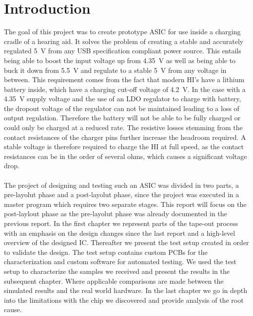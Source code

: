 \section{Introduction}
\label{chap:introduction}
The goal of this project was to create prototype \ac{ASIC} for use inside a charging cradle of a hearing aid. It solves the problem of creating a stable and accurately regulated \qty{5}{\volt} from any USB specification compliant power source. This entails being able to boost the input voltage up from \qty{4.35}{\volt} as well as being able to buck it down from \qty{5.5}{\volt} and regulate to a stable \qty{5}{\volt} from any voltage in between. This requirement comes from the fact that modern \ac{HI}'s have a lithium battery inside, which have a charging cut-off voltage of \qty{4.2}{\volt}. In the case with a \qty{4.35}{\volt} supply voltage and the use of an \ac{LDO} regulator to charge with battery, the dropout voltage of the regulator can not be maintained leading to a loss of output regulation. Therefore the battery will not be able to be fully charged or could only be charged at a reduced rate. The resistive losses stemming from the contact resistances of the charger pins further increase the headroom required. A stable voltage is therefore required to charge the \ac{HI} at full speed, as the contact resistances can be in the order of several ohms, which causes a significant voltage drop. \cite{analog_devices_usb_charging} \\\\
The project of designing and testing such an \ac{ASIC} was divided in two parts, a \glqq pre-layolut phase\grqq{} and a \glqq post-layolut phase\grqq{}, since the project was executed in a master program which requires two separate stages. This report will focus on the \glqq post-laylout phase\grqq{} as the \glqq pre-layolut phase\grqq{} was already documented in the previous report. In the first chapter we represent parts of the tape-out process with an emphasis on the design changes since the last report and a high-level overview of the designed \ac{IC}. Thereafter we present the test setup created in order to validate the design. The test setup contains custom \ac{PCB}s for the characterization and custom software for automated testing. We used the test setup to characterize the samples we received and present the results in the subsequent chapter. Where applicable comparisons are made between the simulated results and the real world hardware. In the last chapter we go in depth into the limitations with the chip we discovered and provide analysis of the root cause.\\\\
\clearpage